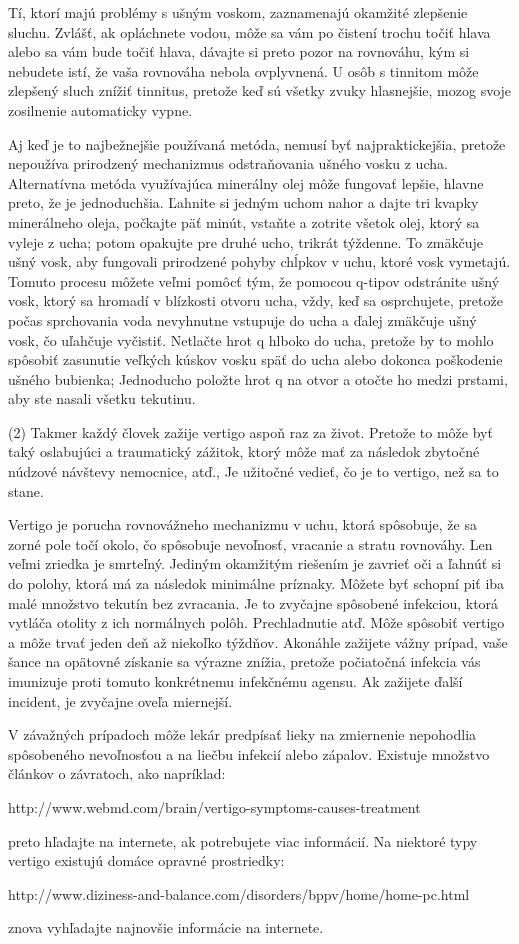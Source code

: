 \documentclass[11pt,a4paper%
]{article}
\begin{document}
Tí, ktorí majú problémy s ušným voskom, zaznamenajú okamžité zlepšenie sluchu. Zvlášť, ak opláchnete vodou, môže sa vám po čistení trochu točiť hlava alebo sa vám bude točiť hlava, dávajte si preto pozor na rovnováhu, kým si nebudete istí, že vaša rovnováha nebola ovplyvnená. U osôb s tinnitom môže zlepšený sluch znížiť tinnitus, pretože keď sú všetky zvuky hlasnejšie, mozog svoje zosilnenie automaticky vypne.

Aj keď je to najbežnejšie používaná metóda, nemusí byť najpraktickejšia, pretože nepoužíva prirodzený mechanizmus odstraňovania ušného vosku z ucha. Alternatívna metóda využívajúca minerálny olej môže fungovať lepšie, hlavne preto, že je jednoduchšia. Ľahnite si jedným uchom nahor a dajte tri kvapky minerálneho oleja, počkajte päť minút, vstaňte a zotrite všetok olej, ktorý sa vyleje z ucha; potom opakujte pre druhé ucho, trikrát týždenne. To zmäkčuje ušný vosk, aby fungovali prirodzené pohyby chĺpkov v uchu, ktoré vosk vymetajú. Tomuto procesu môžete veľmi pomôcť tým, že pomocou q-tipov odstránite ušný vosk, ktorý sa hromadí v blízkosti otvoru ucha, vždy, keď sa osprchujete, pretože počas sprchovania voda nevyhnutne vstupuje do ucha a ďalej zmäkčuje ušný vosk, čo uľahčuje vyčistiť.
Netlačte hrot q hlboko do ucha, pretože by to mohlo spôsobiť zasunutie veľkých kúskov vosku späť do ucha alebo dokonca poškodenie ušného bubienka; Jednoducho položte hrot q na otvor a otočte ho medzi prstami, aby ste nasali všetku tekutinu.

(2) Takmer každý človek zažije vertigo aspoň raz za život. Pretože to môže byť taký oslabujúci a traumatický zážitok, ktorý môže mať za následok zbytočné núdzové návštevy nemocnice,
atď., Je užitočné vedieť, čo je to vertigo, než sa to stane.

Vertigo je porucha rovnovážneho mechanizmu v uchu, ktorá spôsobuje, že sa zorné pole točí okolo, čo spôsobuje nevoľnosť, vracanie a stratu rovnováhy. Len veľmi zriedka je smrteľný. Jediným okamžitým riešením je zavrieť oči a ľahnúť si do polohy, ktorá má za následok minimálne príznaky. Môžete byť schopní piť iba malé množstvo tekutín bez zvracania. Je to zvyčajne spôsobené infekciou, ktorá vytláča otolity z ich normálnych polôh. Prechladnutie atď. Môže spôsobiť vertigo a môže trvať jeden deň až niekoľko týždňov. Akonáhle zažijete vážny prípad, vaše šance na opätovné získanie sa výrazne znížia, pretože počiatočná infekcia vás imunizuje proti tomuto konkrétnemu infekčnému agensu. Ak zažijete ďalší incident, je zvyčajne oveľa miernejší.

V závažných prípadoch môže lekár predpísať lieky na zmiernenie nepohodlia spôsobeného nevoľnosťou a na liečbu infekcií alebo zápalov. Existuje množstvo článkov o závratoch, ako napríklad:

http://www.webmd.com/brain/vertigo-symptoms-causes-treatment

preto hľadajte na internete, ak potrebujete viac informácií. Na niektoré typy vertigo existujú domáce opravné prostriedky:

http://www.diziness-and-balance.com/disorders/bppv/home/home-pc.html

znova vyhľadajte najnovšie informácie na internete.
\end{document}
